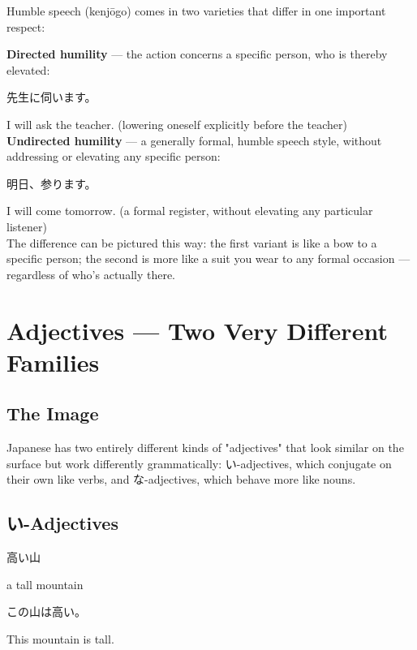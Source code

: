 \documentclass[12pt]{book}
\begin{document}
Humble speech (kenjōgo) comes in two varieties that differ in one important respect:

\textbf{Directed humility} — the action concerns a specific person, who is thereby elevated:
\par\quad 先生に伺います。\\
\par\quad I will ask the teacher. (lowering oneself explicitly before the teacher)\\

\textbf{Undirected humility} — a generally formal, humble speech style, without addressing or elevating any specific person:
\par\quad 明日、参ります。\\
\par\quad I will come tomorrow. (a formal register, without elevating any particular listener)\\

The difference can be pictured this way: the first variant is like a bow to a specific person; the second is more like a suit you wear to any formal occasion — regardless of who's actually there.


\chapter{Adjectives — Two Very Different Families}

\section*{The Image}

Japanese has two entirely different kinds of "adjectives" that look similar on the surface but work differently grammatically: い-adjectives, which conjugate on their own like verbs, and な-adjectives, which behave more like nouns.

\section*{い-Adjectives}

\par\quad 高い山\\
\par\quad a tall mountain\\

\par\quad この山は高い。\\
\par\quad This mountain is tall.\\
\end{document}
